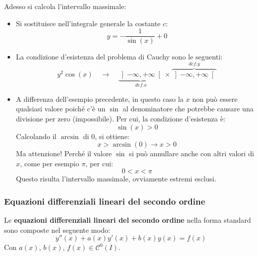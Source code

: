 \documentclass[a4paper]{article}
\newcommand{\definition}[1]{\textcolor{Red3}{\textbf{#1}}}
\begin{document}
	\noindent
	Adesso si calcola l'intervallo massimale:
	\begin{itemize}
		\item Si sostituisce nell'integrale generale la costante $c$:
		\begin{equation*}
			y = -\dfrac{1}{\sin\left(x\right)} + 0
		\end{equation*}
		
		\item La condizione d'esistenza del problema di Cauchy sono le seguenti:
		\begin{equation*}
			y^{2}\cos\left(x\right) \hspace{1em} \longrightarrow \hspace{1em} \underbrace{\left] -\infty, +\infty \right[}_{def. x} \times \overbrace{\left] -\infty, +\infty \right[}^{def. y}
		\end{equation*}

		\item A differenza dell'esempio precedente, in questo caso la $x$ non può essere qualsiasi valore poiché c'è un $\sin$ al denominatore che potrebbe causare una divisione per zero (impossibile). Per cui, la condizione d'esistenza è:
		\begin{equation*}
			\sin\left(x\right) > 0
		\end{equation*}
		Calcolando il $\arcsin$ di $0$, si ottiene:
		\begin{equation*}
			x > \arcsin\left(0\right) \longrightarrow x > 0
		\end{equation*}
		Ma attenzione! Perché il valore $\sin$ si può annullare anche con altri valori di $x$, come per esempio $\pi$, per cui:
		\begin{equation*}
			0 < x < \pi
		\end{equation*}
		Questo risulta l'intervallo massimale, ovviamente estremi esclusi.
	\end{itemize}\newpage

	\subsubsection{Equazioni differenziali lineari del secondo ordine}\label{subsubsection: equazioni differenziali lineari del secondo ordine}

	Le \definition{equazioni differenziali lineari del secondo ordine} nella forma standard sono composte nel seguente modo:
	\begin{equation*}
		y''\left(x\right) + a\left(x\right)y'\left(x\right) + b\left(x\right)y\left(x\right) = f\left(x\right)
	\end{equation*}
	Con $a\left(x\right)$, $b\left(x\right)$, $f\left(x\right) \in \mathcal{C}^{0}\left(I\right)$.\newline
\end{document}
